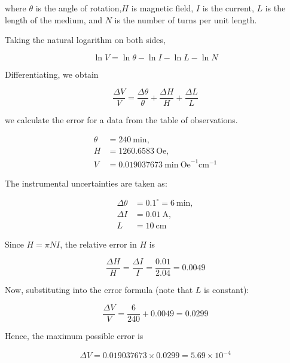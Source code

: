 where $\theta$ is the angle of rotation,$H$ is magnetic field, $I$ is the current, $L$ is the length of the medium, and $N$ is the number of turns per unit length.

Taking the natural logarithm on both sides,

\begin{equation}
\ln V = \ln \theta - \ln I - \ln L - \ln N
\end{equation}

Differentiating, we obtain

\begin{equation}
\boxed{\frac{\Delta V}{V}
=
\frac{\Delta \theta}{\theta}
+
\frac{\Delta H}{H}
+
\frac{\Delta L}{L}}
\end{equation}

we calculate the error for a data from the table of observations.

\begin{align*}
\theta &= 240 \ \text{min}, \\
H &= 1260.6583 \ \text{Oe}, \\
V &= 0.019037673 \ \text{min}\ \text{Oe}^{-1}\text{cm}^{-1}
\end{align*}

The instrumental uncertainties are taken as:

\begin{align*}
\Delta \theta &= 0.1^\circ = 6 \ \text{min}, \\
\Delta I &= 0.01 \ \text{A}, \\
L &= 10 \ \text{cm}
\end{align*}

Since $H = \pi N I$, the relative error in $H$ is

\begin{equation}
\frac{\Delta H}{H} = \frac{\Delta I}{I} = \frac{0.01}{2.04} = 0.0049
\end{equation}

Now, substituting into the error formula (note that $L$ is constant):

\begin{equation}
\frac{\Delta V}{V}
=
\frac{6}{240}
+
0.0049 = 0.0299
\end{equation}

Hence, the maximum possible error is

\begin{equation}
\Delta V = 0.019037673 \times 0.0299
= 5.69 \times 10^{-4}
\end{equation}

